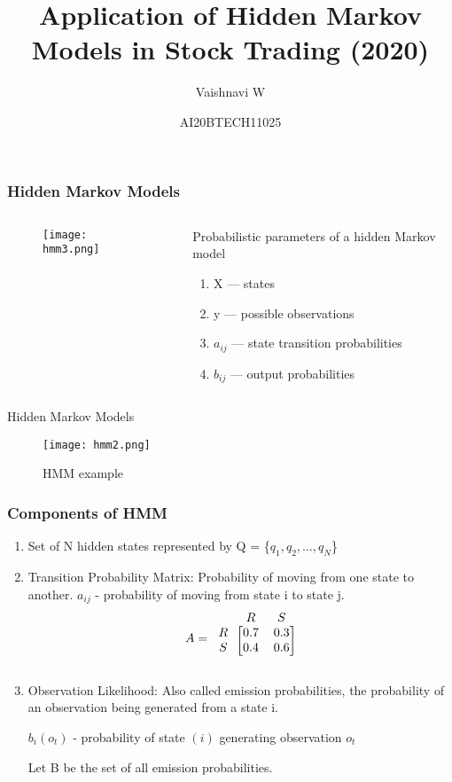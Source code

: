 \documentclass{beamer}
\title{Application of Hidden Markov Models in Stock Trading (2020)}
\author{Vaishnavi W}
\institute{IITH AI}
\date{AI20BTECH11025}
\providecommand{\brak}[1]{\ensuremath{\left(#1\right)}}
\begin{document}
\begin{frame}
\titlepage
\end{frame}
\begin{frame}
\frametitle{Hidden Markov Models}
\begin{columns}
\begin{column}{0.5\textwidth}
\begin{figure}
\begin{flushleft}
\texttt{[image: hmm3.png]}
\end{flushleft}
\end{figure}
\end{column}
\begin{column}{0.5\textwidth}
Probabilistic parameters of a hidden Markov model 
\begin{enumerate}
    \item X — states 
    \item y — possible observations 
    \item $a_{ij}$ — state transition probabilities 
    \item $b_{ij}$ — output probabilities 
\end{enumerate}

\end{column}
\end{columns}

\end{frame}
\begin{frame}{Hidden Markov Models}
 \begin{figure}[H]
\centering
\texttt{[image: hmm2.png]}
\caption{HMM example}
\label{fig1}
\end{figure}
\end{frame}


\begin{frame}
\frametitle{Components of HMM}
\begin{enumerate}
    \item Set of N hidden states represented by Q = \{$q_1,q_2,\dots,q_N$\}
    \item Transition Probability Matrix: Probability of moving from one state to another. $a_{ij}$ - probability of moving from state i to state j.
\begin{align}
\label{eq:A}
A=\begin{blockarray}{ccc}
&R & S  \\
\begin{block}{c[cc]}
  R & 0.7 & 0.3  \\
  S & 0.4 & 0.6  \\
\end{block}
\end{blockarray}
\label{eq:B}
\end{align}
 \item Observation Likelihood: Also called emission probabilities, the probability of an 
observation being generated from a state i.

$b_i\brak{o_t}$ - probability of state \brak{i} generating observation $o_t$
    
 Let B be the set of all emission probabilities.
\end{enumerate}
\end{frame}
\end{document}
